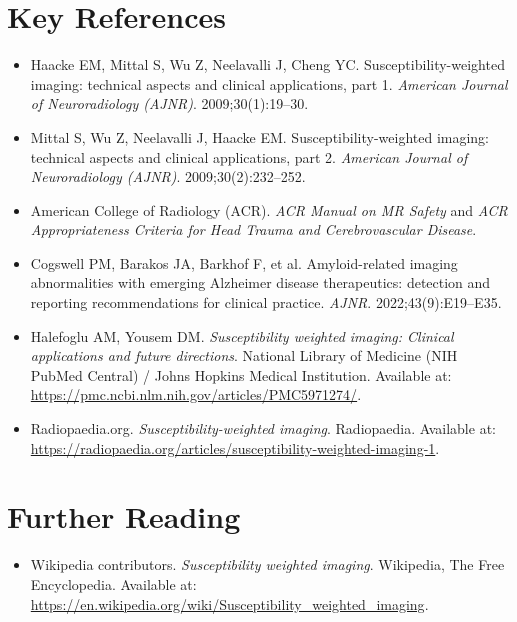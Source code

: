 \section{Key References}

\begin{itemize}
    \item Haacke EM, Mittal S, Wu Z, Neelavalli J, Cheng YC. Susceptibility-weighted imaging: technical aspects and clinical applications, part 1. \textit{American Journal of Neuroradiology (AJNR)}. 2009;30(1):19--30.
    \item Mittal S, Wu Z, Neelavalli J, Haacke EM. Susceptibility-weighted imaging: technical aspects and clinical applications, part 2. \textit{American Journal of Neuroradiology (AJNR)}. 2009;30(2):232--252.
    \item American College of Radiology (ACR). \textit{ACR Manual on MR Safety} and \textit{ACR Appropriateness Criteria for Head Trauma and Cerebrovascular Disease}.
    \item Cogswell PM, Barakos JA, Barkhof F, et al. Amyloid-related imaging abnormalities with emerging Alzheimer disease therapeutics: detection and reporting recommendations for clinical practice. \textit{AJNR}. 2022;43(9):E19--E35.
    \item Halefoglu AM, Yousem DM. \textit{Susceptibility weighted imaging: Clinical applications and future directions}. National Library of Medicine (NIH PubMed Central) / Johns Hopkins Medical Institution. Available at: \url{https://pmc.ncbi.nlm.nih.gov/articles/PMC5971274/}.
    \item Radiopaedia.org. \textit{Susceptibility-weighted imaging}. Radiopaedia. Available at: \url{https://radiopaedia.org/articles/susceptibility-weighted-imaging-1}.
\end{itemize}

\section{Further Reading}
\begin{itemize}
  \item Wikipedia contributors. \textit{Susceptibility weighted imaging}. Wikipedia, The Free Encyclopedia. Available at: \url{https://en.wikipedia.org/wiki/Susceptibility_weighted_imaging}.
\end{itemize}
